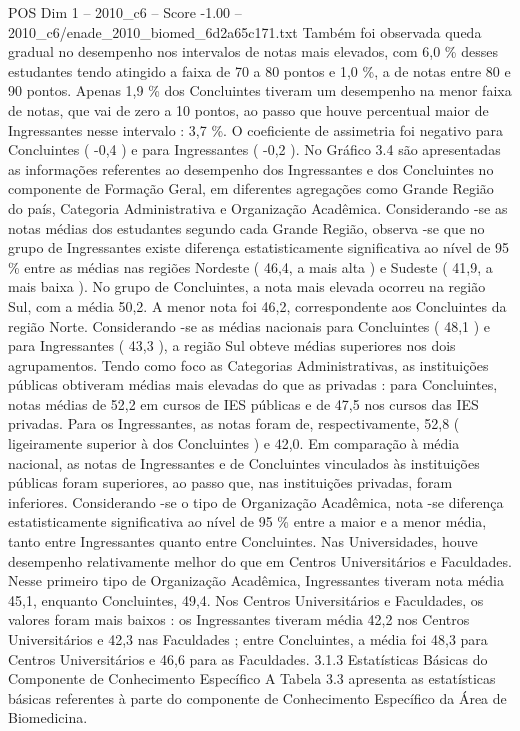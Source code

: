 \begin{textsample}{POS Dim 1 – 2010\_c6 – Score -1.00 – 2010\_c6/enade\_2010\_biomed\_6d2a65c171.txt}
Também foi observada queda gradual no desempenho nos intervalos de notas mais elevados, com 6,0 \% desses estudantes tendo atingido a faixa de 70 a 80 pontos e 1,0 \%, a de notas entre 80 e 90 pontos.
Apenas 1,9 \% dos Concluintes tiveram um desempenho na menor faixa de notas, que vai de zero a 10 pontos, ao passo que houve percentual maior de Ingressantes nesse intervalo : 3,7 \%.
O coeficiente de assimetria foi negativo para Concluintes ( -0,4 ) e para Ingressantes ( -0,2 ).
No Gráfico 3.4 são apresentadas as informações referentes ao desempenho dos Ingressantes e dos Concluintes no componente de Formação Geral, em diferentes agregações como Grande Região do país, Categoria Administrativa e Organização Acadêmica.
Considerando -se as notas médias dos estudantes segundo cada Grande Região, observa -se que no grupo de Ingressantes existe diferença estatisticamente significativa ao nível de 95 \% entre as médias nas regiões Nordeste ( 46,4, a mais alta ) e Sudeste ( 41,9, a mais baixa ).
No grupo de Concluintes, a nota mais elevada ocorreu na região Sul, com a média 50,2.
A menor nota foi 46,2, correspondente aos Concluintes da região Norte.
Considerando -se as médias nacionais para Concluintes ( 48,1 ) e para Ingressantes ( 43,3 ), a região Sul obteve médias superiores nos dois agrupamentos.
Tendo como foco as Categorias Administrativas, as instituições públicas obtiveram médias mais elevadas do que as privadas : para Concluintes, notas médias de 52,2 em cursos de IES públicas e de 47,5 nos cursos das IES privadas.
Para os Ingressantes, as notas foram de, respectivamente, 52,8 ( ligeiramente superior à dos Concluintes ) e 42,0.
Em comparação à média nacional, as notas de Ingressantes e de Concluintes vinculados às instituições públicas foram superiores, ao passo que, nas instituições privadas, foram inferiores.
Considerando -se o tipo de Organização Acadêmica, nota -se diferença estatisticamente significativa ao nível de 95 \% entre a maior e a menor média, tanto entre Ingressantes quanto entre Concluintes.
Nas Universidades, houve desempenho relativamente melhor do que em Centros Universitários e Faculdades.
Nesse primeiro tipo de Organização Acadêmica, Ingressantes tiveram nota média 45,1, enquanto Concluintes, 49,4.
Nos Centros Universitários e Faculdades, os valores foram mais baixos : os Ingressantes tiveram média 42,2 nos Centros Universitários e 42,3 nas Faculdades ; entre Concluintes, a média foi 48,3 para Centros Universitários e 46,6 para as Faculdades. 3.1.3 Estatísticas Básicas do Componente de Conhecimento Específico A Tabela 3.3 apresenta as estatísticas básicas referentes à parte do componente de Conhecimento Específico da Área de Biomedicina.

\end{textsample}
